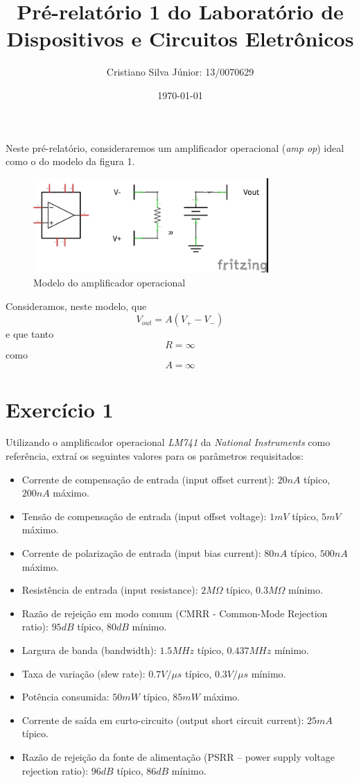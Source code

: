 \documentclass[12pt, a4paper, twoside]{article}
\begin{document}
\title{Pré-relatório 1 do Laboratório de Dispositivos e Circuitos Eletrônicos}
\author{Cristiano Silva Júnior: 13/0070629}
\date{\today}
\maketitle

Neste pré-relatório, consideraremos um amplificador operacional (\textit{amp op}) ideal como o do modelo da figura 1.

\begin{figure}
    \centering
    \includegraphics[width=0.8\textwidth]{figs/ex0.jpg}
    \caption{Modelo do amplificador operacional}
\end{figure}

Consideramos, neste modelo, que
$$ V_{out} = A (V_+ - V_-) $$
e que tanto
$$ R = \infty $$
como
$$ A = \infty $$

\section{Exercício 1}

Utilizando o amplificador operacional \textit{LM741} da \textit{National Instruments} como referência, extraí os seguintes valores para os parâmetros requisitados:

\begin{itemize}
    \item Corrente de compensação de entrada (input offset current): $20nA$ típico, $200nA$ máximo.
    \item Tensão de compensação de entrada (input offset voltage): $1mV$ típico, $5mV$ máximo.
    \item Corrente de polarização de entrada (input bias current): $80nA$ típico, $500nA$ máximo.
    \item Resistência de entrada (input resistance): $2M\Omega$ típico, $0.3M\Omega$ mínimo.
    \item Razão de rejeição em modo comum (CMRR - Common-Mode Rejection ratio): $95dB$ típico, $80dB$ mínimo.
    \item Largura de banda (bandwidth): $1.5MHz$ típico, $0.437MHz$ mínimo.
    \item Taxa de variação (slew rate): $0.7V/\mu s$ típico, $0.3V/\mu s$ mínimo.
    \item Potência consumida: $50mW$ típico, $85mW$ máximo.
    \item Corrente de saída em curto-circuito (output short circuit current): $25mA$ típico.
    \item Razão de rejeição da fonte de alimentação (PSRR – power supply voltage rejection ratio): $96dB$ típico, $86dB$ mínimo.
\end{itemize}
\end{document}
